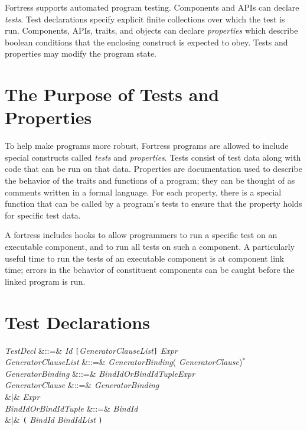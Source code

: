 Fortress supports automated program testing.
Components and APIs can declare \emph{tests}.
Test declarations specify explicit finite collections over which the
test is run.
Components, APIs, traits, and objects can declare \emph{properties}
which describe boolean conditions that the enclosing construct is expected
to obey.  Tests and properties may modify the program state.

\section{The Purpose of Tests and Properties}
To help make programs more robust, Fortress programs are allowed
to include special constructs called
\emph{tests} and \emph{properties}.  Tests consist of test data
along with code that can be run on that data.
Properties are documentation used to describe the behavior
of the traits and functions of a program; they can be thought of
as comments written in a formal language.
For each property, there is a special function that can be
called by a program's tests to ensure that the property holds for specific
test data.


A fortress includes hooks to allow programmers to run a specific test
on an executable component, and to run all tests on such a component.
A particularly useful time to run
the tests of an executable component is at component link time;
errors in the behavior of constituent components can be caught
before the linked program is run.


\section{Test Declarations}

\begin{Grammar}
\emph{TestDecl} &::=&  \emph{Id} \texttt[\emph{GeneratorClauseList}\texttt]
\EXP{=} \emph{Expr} \\

\emph{GeneratorClauseList} &::=& \emph{GeneratorBinding}(\EXP{,} \emph{GeneratorClause})$^*$\\

\emph{GeneratorBinding}
&::=& \emph{BindIdOrBindIdTuple}\EXP{\leftarrow}\emph{Expr} \\

\emph{GeneratorClause}
&::=& \emph{GeneratorBinding}\\
&$|$& \emph{Expr} \\

\emph{BindIdOrBindIdTuple}
&::=& \emph{BindId}\\
&$|$& \texttt{(} \emph{BindId}\EXP{,} \emph{BindIdList} \texttt{)}\\

\end{Grammar}

